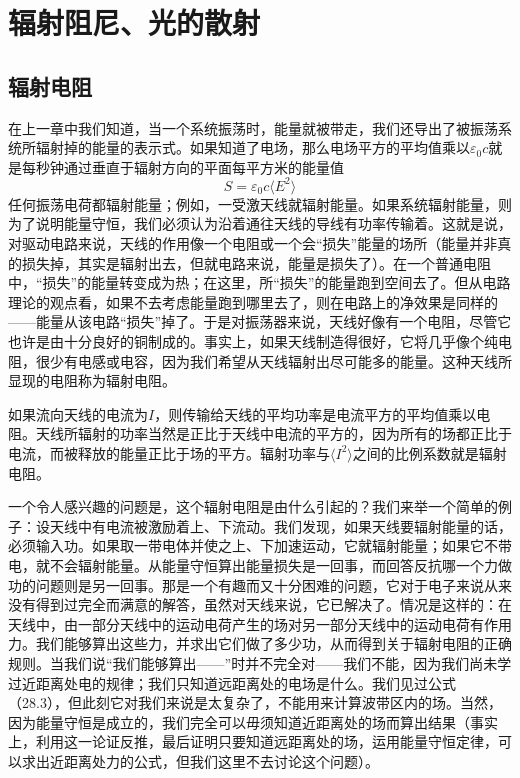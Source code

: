 \chapter{辐射阻尼、光的散射}

\section{辐射电阻}

在上一章中我们知道，当一个系统振荡时，能量就被带走，我们还导出了被振荡系统所辐射掉的能量的表示式。如果知道了电场，那么电场平方的平均值乘以$\varepsilon_0c$就是每秒钟通过垂直于辐射方向的平面每平方米的能量值
\begin{equation}
    \label{Eq:I:32:1}
    S=\varepsilon_0c \langle E^2 \rangle
\end{equation}
任何振荡电荷都辐射能量；例如，一受激天线就辐射能量。如果系统辐射能量，则为了说明能量守恒，我们必须认为沿着通往天线的导线有功率传输着。这就是说，对驱动电路来说，天线的作用像一个电阻或一个会“损失”能量的场所（能量并非真的损失掉，其实是辐射出去，但就电路来说，能量是损失了）。在一个普通电阻中，“损失”的能量转变成为热；在这里，所“损失”的能量跑到空间去了。但从电路理论的观点看，如果不去考虑能量跑到哪里去了，则在电路上的净效果是同样的——能量从该电路“损失”掉了。于是对振荡器来说，天线好像有一个电阻，尽管它也许是由十分良好的铜制成的。事实上，如果天线制造得很好，它将几乎像个纯电阻，很少有电感或电容，因为我们希望从天线辐射出尽可能多的能量。这种天线所显现的电阻称为辐射电阻。

如果流向天线的电流为$I$，则传输给天线的平均功率是电流平方的平均值乘以电阻。天线所辐射的功率当然是正比于天线中电流的平方的，因为所有的场都正比于电流，而被释放的能量正比于场的平方。辐射功率与$\langle I^2 \rangle$之间的比例系数就是辐射电阻。

一个令人感兴趣的问题是，这个辐射电阻是由什么引起的？我们来举一个简单的例子：设天线中有电流被激励着上、下流动。我们发现，如果天线要辐射能量的话，必须输入功。如果取一带电体并使之上、下加速运动，它就辐射能量；如果它不带电，就不会辐射能量。从能量守恒算出能量损失是一回事，而回答反抗哪一个力做功的问题则是另一回事。那是一个有趣而又十分困难的问题，它对于电子来说从来没有得到过完全而满意的解答，虽然对天线来说，它已解决了。情况是这样的：在天线中，由一部分天线中的运动电荷产生的场对另一部分天线中的运动电荷有作用力。我们能够算出这些力，并求出它们做了多少功，从而得到关于辐射电阻的正确规则。当我们说“我们能够算出——”时并不完全对——我们不能，因为我们尚未学过近距离处电的规律；我们只知道远距离处的电场是什么。我们见过公式（28.3），但此刻它对我们来说是太复杂了，不能用来计算波带区内的场。当然，因为能量守恒是成立的，我们完全可以毋须知道近距离处的场而算出结果（事实上，利用这一论证反推，最后证明只要知道远距离处的场，运用能量守恒定律，可以求出近距离处力的公式，但我们这里不去讨论这个问题）。

